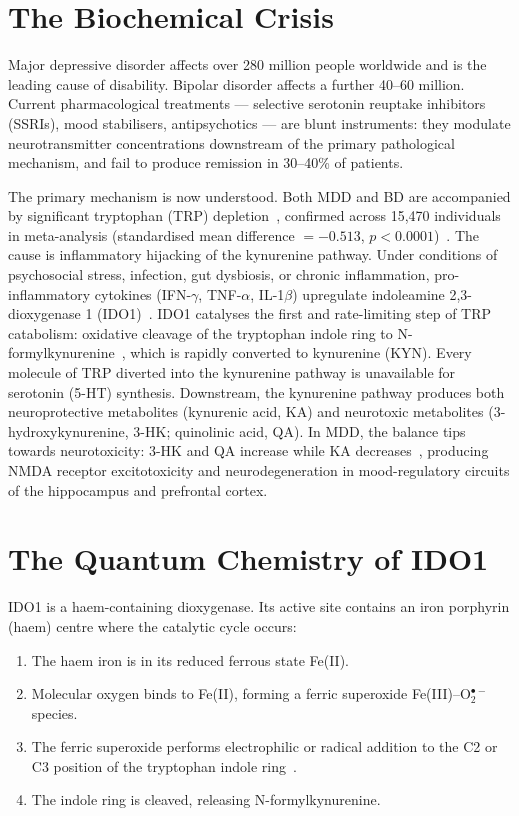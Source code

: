 \documentclass[aps,prl,preprint,superscriptaddress,floatfix]{revtex4-2}
\begin{document}
\section{The Biochemical Crisis}

Major depressive disorder affects over 280 million people worldwide and is
the leading cause of disability. Bipolar disorder affects a further 40--60
million. Current pharmacological treatments --- selective serotonin reuptake
inhibitors (SSRIs), mood stabilisers, antipsychotics --- are blunt instruments:
they modulate neurotransmitter concentrations downstream of the primary
pathological mechanism, and fail to produce remission in 30--40\% of patients.

The primary mechanism is now understood. Both MDD and BD are accompanied
by significant tryptophan (TRP) depletion~\cite{ogawa2014,hashimoto2016},
confirmed across 15,470 individuals in meta-analysis (standardised mean
difference $= -0.513$, $p < 0.0001$)~\cite{almulla2021}. The cause is
inflammatory hijacking of the kynurenine pathway. Under conditions of
psychosocial stress, infection, gut dysbiosis, or chronic inflammation,
pro-inflammatory cytokines (IFN-$\gamma$, TNF-$\alpha$, IL-1$\beta$)
upregulate indoleamine 2,3-dioxygenase 1 (IDO1)~\cite{schwarcz2012}.
IDO1 catalyses the first and rate-limiting step of TRP catabolism:
oxidative cleavage of the tryptophan indole ring to
N-formylkynurenine~\cite{hayaishi1976}, which is rapidly converted to
kynurenine (KYN). Every molecule of TRP diverted into the kynurenine
pathway is unavailable for serotonin (5-HT) synthesis. Downstream,
the kynurenine pathway produces both neuroprotective metabolites
(kynurenic acid, KA) and neurotoxic metabolites (3-hydroxykynurenine,
3-HK; quinolinic acid, QA). In MDD, the balance tips towards neurotoxicity:
3-HK and QA increase while KA decreases~\cite{erhardt2017}, producing
NMDA receptor excitotoxicity and neurodegeneration in mood-regulatory
circuits of the hippocampus and prefrontal cortex.

\section{The Quantum Chemistry of IDO1}

IDO1 is a haem-containing dioxygenase. Its active site contains an iron
porphyrin (haem) centre where the catalytic cycle occurs:

\begin{enumerate}
\item The haem iron is in its reduced ferrous state Fe(II).
\item Molecular oxygen binds to Fe(II), forming a ferric superoxide
  Fe(III)--O$_2^{\bullet-}$ species.
\item The ferric superoxide performs electrophilic or radical addition
  to the C2 or C3 position of the tryptophan indole ring~\cite{zhang2007,
  lewis2006}.
\item The indole ring is cleaved, releasing N-formylkynurenine.
\end{enumerate}
\end{document}
